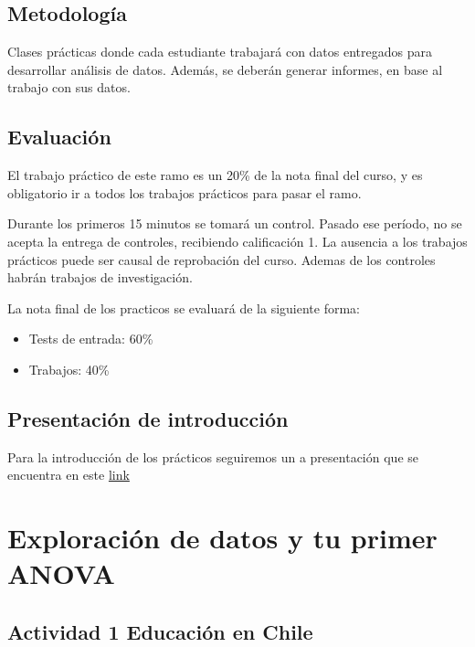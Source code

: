 \documentclass[]{book}
\providecommand{\tightlist}{%
  \setlength{\itemsep}{0pt}\setlength{\parskip}{0pt}}
\begin{document}
\hypertarget{metodologia}{%
\section{Metodología}\label{metodologia}}

Clases prácticas donde cada estudiante trabajará con datos entregados para desarrollar análisis de datos. Además, se deberán generar informes, en base al trabajo con sus datos.

\hypertarget{evaluacion}{%
\section{Evaluación}\label{evaluacion}}

El trabajo práctico de este ramo es un 20\% de la nota final del curso, y es obligatorio ir a todos los trabajos prácticos para pasar el ramo.

Durante los primeros 15 minutos se tomará un control. Pasado ese período, no se acepta la entrega de controles, recibiendo calificación 1. La ausencia a los trabajos prácticos puede ser causal de reprobación del curso. Ademas de los controles habrán trabajos de investigación.

La nota final de los practicos se evaluará de la siguiente forma:

\begin{itemize}
\tightlist
\item
  Tests de entrada: 60\%
\item
  Trabajos: 40\%
\end{itemize}

\hypertarget{presentacion-de-introduccion}{%
\section{Presentación de introducción}\label{presentacion-de-introduccion}}

Para la introducción de los prácticos seguiremos un a presentación que se encuentra en este \href{http://www.derek-corcoran-barrios.com/AyudantiaStatsPres/Clase1/Clase1.html}{link}

\hypertarget{Explorando}{%
\chapter{Exploración de datos y tu primer ANOVA}\label{Explorando}}

\hypertarget{actividad-1-educacion-en-chile}{%
\section{Actividad 1 Educación en Chile}\label{actividad-1-educacion-en-chile}}
\end{document}
